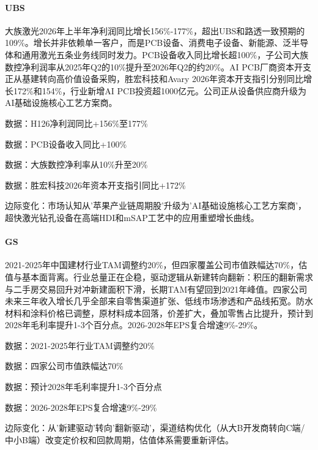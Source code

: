 \documentclass[11pt]{ctexart}
\begin{document}
\paragraph{UBS} 大族激光2026年上半年净利润同比增长156\%-177\%，超出UBS和路透一致预期的109\%。增长并非依赖单一客户，而是PCB设备、消费电子设备、新能源、泛半导体和通用激光五条业务线同时发力。PCB设备收入同比增长超100\%，子公司大族数控净利润率从2025年Q2的10\%提升至2026年Q2的约20\%。AI PCB厂商资本开支正从基建转向高价值设备采购，胜宏科技和Avary 2026年资本开支指引分别同比增长172\%和154\%，行业新增AI PCB投资超1000亿元。公司正从设备供应商升级为AI基础设施核心工艺方案商。
{\small\color{refgray}数据：H126净利润同比+156\%至177\%\par}
{\small\color{refgray}数据：PCB设备收入同比+100\%\par}
{\small\color{refgray}数据：大族数控净利率从10\%升至20\%\par}
{\small\color{refgray}数据：胜宏科技2026年资本开支指引同比+172\%\par}
{\small\color{refgray}边际变化：市场认知从'苹果产业链周期股'升级为'AI基础设施核心工艺方案商'，超快激光钻孔设备在高端HDI和mSAP工艺中的应用重塑增长曲线。\par}
\paragraph{GS} 2021-2025年中国建材行业TAM调整约20\%，但四家覆盖公司市值跌幅达70\%，估值与基本面背离。行业总量正在企稳，驱动逻辑从新建转向翻新：积压的翻新需求与二手房交易回升对冲新建面积下滑，长期TAM有望回到2021年峰值。四家公司未来三年收入增长几乎全部来自零售渠道扩张、低线市场渗透和产品线拓宽。防水材料和涂料价格已调整，原材料成本回落，价差扩大，叠加零售占比提升，预计到2028年毛利率提升1-3个百分点。2026-2028年EPS复合增速9\%-29\%。
{\small\color{refgray}数据：2021-2025年行业TAM调整约20\%\par}
{\small\color{refgray}数据：四家公司市值跌幅达70\%\par}
{\small\color{refgray}数据：预计2028年毛利率提升1-3个百分点\par}
{\small\color{refgray}数据：2026-2028年EPS复合增速9\%-29\%\par}
{\small\color{refgray}边际变化：从'新建驱动'转向'翻新驱动'，渠道结构优化（从大B开发商转向C端/中小B端）改变定价权和回款周期，估值体系需要重新评估。\par}
\end{document}
